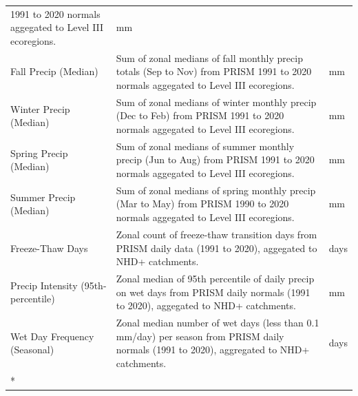 \documentclass[
  10pt,
]{article}
\begin{document}
\begin{longtable}[t]{lp{8cm}l}
1991 to 2020 normals aggegated to Level III ecoregions. & mm\\
Fall Precip (Median) & Sum of zonal medians of fall monthly precip totals (Sep to Nov) from
PRISM 1991 to 2020 normals aggegated to Level III ecoregions. & mm\\
Winter Precip (Median) & Sum of zonal medians of winter monthly precip (Dec to Feb) from PRISM
1991 to 2020 normals aggegated to Level III ecoregions. & mm\\
Spring Precip (Median) & Sum of zonal medians of summer monthly precip (Jun to Aug) from PRISM
1991 to 2020 normals aggegated to Level III ecoregions. & mm\\
Summer Precip (Median) & Sum of zonal medians of spring monthly precip (Mar to May) from PRISM
1990 to 2020 normals aggegated to Level III ecoregions. & mm\\
\addlinespace
Freeze-Thaw Days & Zonal count of freeze-thaw transition days from PRISM daily data (1991
to 2020), aggegated to NHD+ catchments. & days\\
Precip Intensity (95th-percentile) & Zonal median of 95th percentile of daily precip on wet days from PRISM
daily normals (1991 to 2020), aggegated to NHD+ catchments. & mm\\
Wet Day Frequency (Seasonal) & Zonal median number of wet days (less than 0.1 mm/day) per season from
PRISM daily normals (1991 to 2020), aggregated to NHD+ catchments. & days\\*
\end{longtable}
\endgroup{}

\vspace{0.5cm}

\begingroup\fontsize{8}{10}\selectfont
\end{document}

